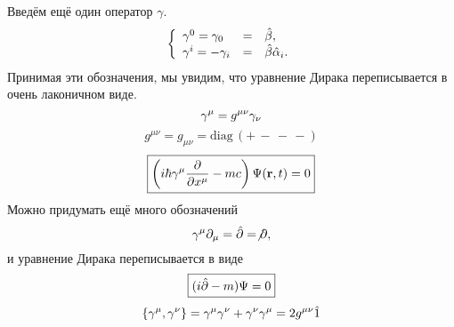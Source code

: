 Введём ещё один оператор $\gamma$.
$$
\left\{
  \begin{array}{lcl}
    \gamma^0 = \gamma_0 & = & \hat \beta ,\\
    \gamma^i = -\gamma_i & = & \hat \beta \hat \alpha_i.
  \end{array}
\right.
$$
Принимая эти обозначения, мы увидим, что уравнение Дирака переписывается в очень лаконичном виде.
$$
    \gamma^\mu = g^{\mu \nu} \gamma_{\nu}
$$
\def \diag{\mathrm{diag}\,}
$$
    g^{\mu \nu} = g_{\mu \nu} = \diag (+ \, - \, - \, -)
$$
$$
    \boxed{
        \left(
            i \hbar \gamma^\mu \dfrac{\partial }{\partial x^\mu} - mc
        \right) \Psi(\mathbf r, t) = 0
    }
$$
Можно придумать ещё много обозначений
$$
    \gamma^\mu \partial_\mu = \hat {\partial} = \not \partial,
$$
и уравнение Дирака переписывается в виде
$$
\boxed{
    (i \hat {\partial} - m)\Psi = 0
    }
$$
$$
    \{\gamma^\mu, \gamma^\nu\} = \gamma^\mu \gamma^\nu + \gamma^\nu \gamma^\mu = 2 g^{\mu \nu} \hat 1
$$